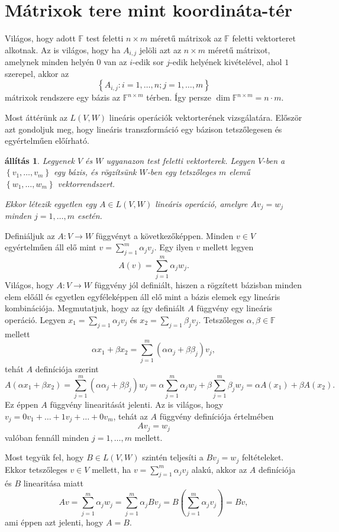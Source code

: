 \documentclass[9pt, a4paper, showtrims]{memoir}
\makeatletter
\renewenvironment{proof}[1][\proofname]
    {\par\pushQED{\qed}%
    \normalfont \topsep6\p@\@plus6\p@\relax
    \trivlist
    \item[\hskip\labelsep
        \itshape
    #1\@addpunct{:}]\ignorespaces}
    {\popQED\endtrivlist\@endpefalse}
\theoremstyle{plain}
\newtheorem{proposition}{állítás}[chapter]
\theoremstyle{remark}
\theoremstyle{definition}
\makeatother
\begin{document}
\section{Mátrixok tere mint koordináta-tér}
Világos, hogy adott $\mathbb{F}$ test feletti $n\times m$ méretű mátrixok az $\mathbb{F}$ feletti
vektorteret alkotnak.
Az is világos, hogy ha $A_{i,j}$ jelöli azt az $n\times m$ méretű mátrixot,
amelynek minden helyén $0$ van az $i$-edik sor $j$-edik helyének kivételével, ahol $1$ szerepel,
akkor az
\[
	\left\{ A_{i,j}:i=1,\ldots,n;j=1,\ldots,m\right\}
\]
mátrixok rendszere egy bázis az $\mathbb{F}^{n\times m}$ térben.
Így persze $\dim \mathbb{F}^{n\times m} = n\cdot m$.

Most áttérünk az $L\left( V,W \right)$ lineáris operációk vektorterének vizsgálatára.
Először azt gondoljuk meg, hogy lineáris transzformáció egy bázison tetszőlegesen és egyértelműen előírható.
\begin{proposition}\label{pr:bazisonegyertelmu}
	Legyenek $V$ és $W$ ugyanazon test feletti vektorterek.
	Legyen $V$-ben a $\left\{ v_1,\ldots,v_m \right\}$ egy bázis,
	és rögzítsünk $W$-ben egy tetszőleges $m$ elemű $\left\{ w_1,\ldots,w_m \right\}$ vektorrendszert.

	Ekkor létezik egyetlen egy $A\in L\left( V,W \right)$ lineáris operáció,
	amelyre $Av_j=w_j$ minden $j=1,\ldots,m$ esetén.
\end{proposition}
\begin{proof}
	Definiáljuk az $A:V\to W$ függvényt a következőképpen.
	Minden $v\in V$ egyértelműen áll elő mint $v=\sum_{j=1}^m\alpha_jv_j$.
	Egy ilyen $v$ mellett legyen
	\[
		A\left( v \right)=\sum_{j=1}^m\alpha_jw_j.
	\]
	Világos, hogy $A:V\to W$ függvény jól definiált, hiszen a rögzített bázisban minden elem előáll és egyetlen egyféleképpen
	áll elő mint a bázis elemek egy lineáris kombinációja.
	Megmutatjuk, hogy az így definiált $A$ függvény egy lineáris operáció.
	Legyen $x_1=\sum_{j=1}\alpha_jv_j$ és
	$x_2=\sum_{j=1}\beta_jv_j$.
	Tetszőleges $\alpha,\beta\in\mathbb{F}$ mellett
	\[
		\alpha x_1+\beta x_2=
		\sum_{j=1}^m\left( \alpha\alpha_j+\beta\beta_j \right)v_j,
	\]
	tehát $A$ definíciója szerint
	\[
		A\left( \alpha x_1+\beta x_2 \right)=
		\sum_{j=1}^m\left( \alpha\alpha_j+\beta\beta_j \right)w_j
		=
		\alpha\sum_{j=1}^m\alpha_jw_j+
		\beta\sum_{j=1}^m\beta_jw_j=
		\alpha A\left( x_1 \right)+\beta A\left( x_2 \right).
	\]
	Ez éppen $A$ függvény linearitását jelenti.
	Az is világos, hogy $v_j=0v_1+\ldots+1v_j+\ldots +0v_m$, tehát az $A$ függvény definíciója értelmében
	\[
		Av_j=w_j
	\] valóban fennáll minden $j=1,\ldots,m$ mellett.

	Most tegyük fel, hogy $B\in L\left( V,W \right)$ szintén teljesíti a $Bv_j=w_j$ feltételeket.
	Ekkor tetszőleges $v\in V$ mellett, ha $v=\sum_{j=1}^m\alpha_jv_j$ alakú,
	akkor az $A$ definíciója és $B$ linearitása miatt
	\[
		Av=\sum_{j=1}^m\alpha_jw_j=
		\sum_{j=1}^m\alpha_jBv_j=
		B\left( \sum_{j=1}^m\alpha_jv_j \right)=Bv,
	\]
	ami éppen azt jelenti, hogy $A=B$.
\end{proof}
\end{document}
